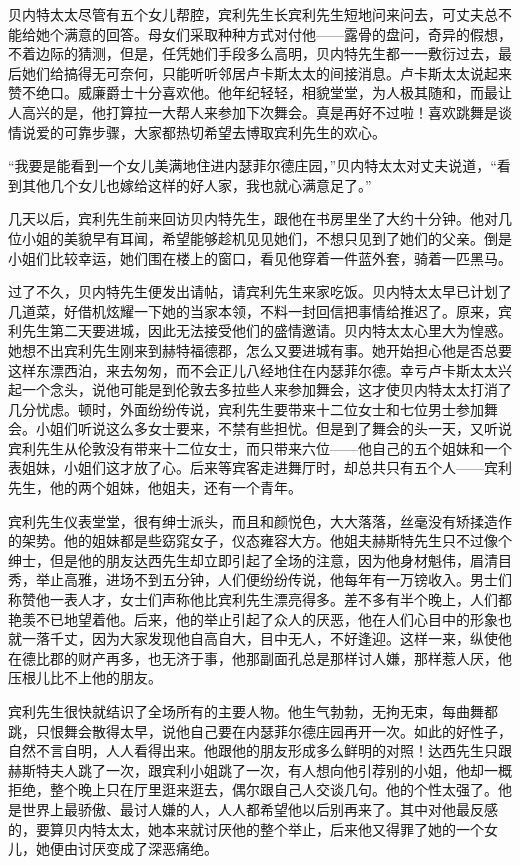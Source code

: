\par 贝内特太太尽管有五个女儿帮腔，宾利先生长宾利先生短地问来问去，可丈夫总不能给她个满意的回答。母女们采取种种方式对付他——露骨的盘问，奇异的假想，不着边际的猜测，但是，任凭她们手段多么高明，贝内特先生都一一敷衍过去，最后她们给搞得无可奈何，只能听听邻居卢卡斯太太的间接消息。卢卡斯太太说起来赞不绝口。威廉爵士十分喜欢他。他年纪轻轻，相貌堂堂，为人极其随和，而最让人高兴的是，他打算拉一大帮人来参加下次舞会。真是再好不过啦！喜欢跳舞是谈情说爱的可靠步骤，大家都热切希望去博取宾利先生的欢心。
\par “我要是能看到一个女儿美满地住进内瑟菲尔德庄园，”贝内特太太对丈夫说道，“看到其他几个女儿也嫁给这样的好人家，我也就心满意足了。”
\par 几天以后，宾利先生前来回访贝内特先生，跟他在书房里坐了大约十分钟。他对几位小姐的美貌早有耳闻，希望能够趁机见见她们，不想只见到了她们的父亲。倒是小姐们比较幸运，她们围在楼上的窗口，看见他穿着一件蓝外套，骑着一匹黑马。
\par 过了不久，贝内特先生便发出请帖，请宾利先生来家吃饭。贝内特太太早已计划了几道菜，好借机炫耀一下她的当家本领，不料一封回信把事情给推迟了。原来，宾利先生第二天要进城，因此无法接受他们的盛情邀请。贝内特太太心里大为惶惑。她想不出宾利先生刚来到赫特福德郡，怎么又要进城有事。她开始担心他是否总要这样东漂西泊，来去匆匆，而不会正儿八经地住在内瑟菲尔德。幸亏卢卡斯太太兴起一个念头，说他可能是到伦敦去多拉些人来参加舞会，这才使贝内特太太打消了几分忧虑。顿时，外面纷纷传说，宾利先生要带来十二位女士和七位男士参加舞会。小姐们听说这么多女士要来，不禁有些担忧。但是到了舞会的头一天，又听说宾利先生从伦敦没有带来十二位女士，而只带来六位——他自己的五个姐妹和一个表姐妹，小姐们这才放了心。后来等宾客走进舞厅时，却总共只有五个人——宾利先生，他的两个姐妹，他姐夫，还有一个青年。
\par 宾利先生仪表堂堂，很有绅士派头，而且和颜悦色，大大落落，丝毫没有矫揉造作的架势。他的姐妹都是些窈窕女子，仪态雍容大方。他姐夫赫斯特先生只不过像个绅士，但是他的朋友达西先生却立即引起了全场的注意，因为他身材魁伟，眉清目秀，举止高雅，进场不到五分钟，人们便纷纷传说，他每年有一万镑收入。男士们称赞他一表人才，女士们声称他比宾利先生漂亮得多。差不多有半个晚上，人们都艳羡不已地望着他。后来，他的举止引起了众人的厌恶，他在人们心目中的形象也就一落千丈，因为大家发现他自高自大，目中无人，不好逢迎。这样一来，纵使他在德比郡的财产再多，也无济于事，他那副面孔总是那样讨人嫌，那样惹人厌，他压根儿比不上他的朋友。
\par 宾利先生很快就结识了全场所有的主要人物。他生气勃勃，无拘无束，每曲舞都跳，只恨舞会散得太早，说他自己要在内瑟菲尔德庄园再开一次。如此的好性子，自然不言自明，人人看得出来。他跟他的朋友形成多么鲜明的对照！达西先生只跟赫斯特夫人跳了一次，跟宾利小姐跳了一次，有人想向他引荐别的小姐，他却一概拒绝，整个晚上只在厅里逛来逛去，偶尔跟自己人交谈几句。他的个性太强了。他是世界上最骄傲、最讨人嫌的人，人人都希望他以后别再来了。其中对他最反感的，要算贝内特太太，她本来就讨厌他的整个举止，后来他又得罪了她的一个女儿，她便由讨厌变成了深恶痛绝。
